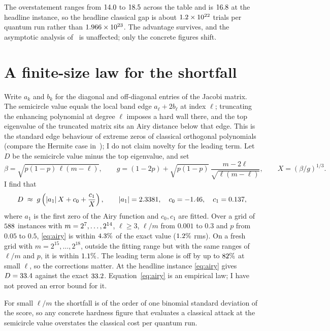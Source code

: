 \documentclass[11pt]{article}
\begin{document}
The overstatement ranges from $14.0$ to $18.5$ across the table and is $16.8$ at the headline instance, so the headline classical gap is about $1.2\times 10^{22}$ trials per quantum run rather than $1.966\times 10^{23}$.
The advantage survives, and the asymptotic analysis of~\cite{khattar2025verifiable} is unaffected; only the concrete figures shift.

\section{A finite-size law for the shortfall}\label{sec:airy}

Write $a_k$ and $b_k$ for the diagonal and off-diagonal entries of the Jacobi matrix. The semicircle value equals the local band edge $a_\ell+2b_\ell$ at index $\ell$; truncating the enhancing polynomial at degree $\ell$ imposes a hard wall there, and the top eigenvalue of the truncated matrix sits an Airy distance below that edge.
This is the standard edge behaviour of extreme zeros of classical orthogonal polynomials (compare the Hermite case in~\cite[\S6.32]{szego1975}); I do not claim novelty for the leading term.
Let $D$ be the semicircle value minus the top eigenvalue, and set
\[
  \beta=\sqrt{p(1-p)\,\ell(m-\ell)},\qquad g=(1-2p)+\sqrt{p(1-p)}\,\frac{m-2\ell}{\sqrt{\ell(m-\ell)}},\qquad X=(\beta/g)^{1/3}.
\]
I find that
\begin{equation}\label{eq:airy}
  D \;\approx\; g\left(|a_1|\,X + c_0 + \frac{c_1}{X}\right), \qquad |a_1| = 2.3381,\quad c_0=-1.46,\quad c_1=0.137,
\end{equation}
where $a_1$ is the first zero of the Airy function and $c_0,c_1$ are fitted.
Over a grid of $588$ instances with $m=2^{7},\dots,2^{14}$, $\ell\ge 3$, $\ell/m$ from $0.001$ to $0.3$ and $p$ from $0.05$ to $0.5$, \eqref{eq:airy} is within $4.3\%$ of the exact value ($1.2\%$ rms).
On a fresh grid with $m=2^{15},\dots,2^{18}$, outside the fitting range but with the same ranges of $\ell/m$ and $p$, it is within $1.1\%$.
The leading term alone is off by up to $82\%$ at small $\ell$, so the corrections matter.
At the headline instance \eqref{eq:airy} gives $D=33.4$ against the exact $33.2$.
Equation~\eqref{eq:airy} is an empirical law; I have not proved an error bound for it.

For small $\ell/m$ the shortfall is of the order of one binomial standard deviation of the score, so any concrete hardness figure that evaluates a classical attack at the semicircle value overstates the classical cost per quantum run.
\end{document}
